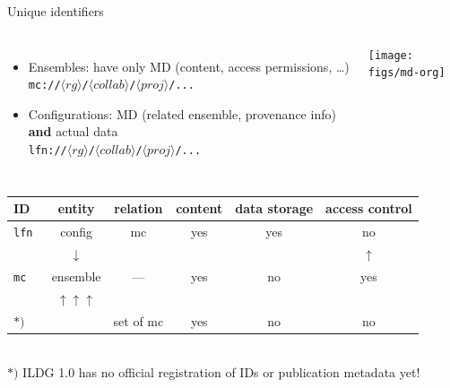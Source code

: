 \documentclass[aspectratio=169,xcolor=dvipsnames]{beamer}
\newcommand{\param}[1]{{$\langle#1\rangle$}}
\def\figs{figs2}
\begin{document}
\begin{frame}{Unique identifiers}

    \begin{columns}[c] 
      \begin{itemize}
      \item \alert{Ensembles:} have only MD (content, access permissions, \ldots)\\
        \hspace*{5em} {\tt \alert{mc}://\param{rg}/\param{collab}/\param{proj}/...} 
      \item Configurations: MD (related ensemble, provenance info)\\
        {\bf and} actual data\\
        \hspace*{5em} {\tt lfn://\param{rg}/\param{collab}/\param{proj}/...} 
      \end{itemize}

      \texttt{[image: \\figs/md-org]}
    \end{columns}

    \begin{center}
      {\footnotesize
        \begin{tabular}{lccccc}
          ID & entity           & relation   & content & data storage & access control \\\hline
          \tt lfn & config      & mc         & yes     & yes  &  no            \\
          & $\downarrow$&            &         &      &  $\uparrow$    \\
          \tt \alert{mc}  & \alert{ensemble}    & ---        & yes     &  no  &  yes      \\
          & $\uparrow\uparrow\uparrow$ \\
          $*)$  & \color{blue}{publication} & set of mc  & yes     &  no            & no 
        \end{tabular}
      }
    \\[5mm]
    $*)$ ILDG 1.0 has no official registration of IDs or publication metadata yet!
    \end{center}
\end{frame}
\end{document}
